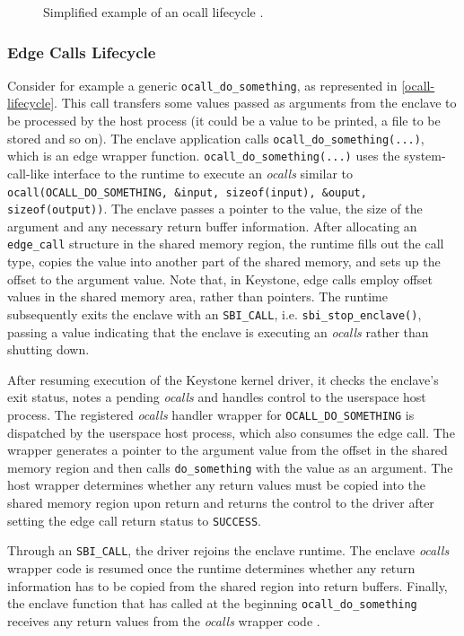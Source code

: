 \begin{figure}[h!]
    \centering
    
    \caption{Simplified example of an ocall lifecycle \cite{keystone-doc}.}
    \label{ocall-lifecycle}
\end{figure}

\subsubsection{Edge Calls Lifecycle}
Consider for example a generic \texttt{ocall\_do\_something}, as represented in \autoref{ocall-lifecycle}. This call transfers some values passed as arguments from the enclave to be processed by the host process (it could be a value to be printed, a file to be stored and so on). The enclave application calls \texttt{ocall\_do\_something(...)}, which is an edge wrapper function.
\texttt{ocall\_do\_something(...)} uses the system-call-like interface to the runtime to execute an \textit{ocalls} similar to \texttt{ocall(OCALL\_DO\_SOMETHING, \&input, sizeof(input), \&ouput,  sizeof(output))}. The enclave passes a pointer to the value, the size of the argument and any necessary return buffer information. 
After allocating an \texttt{edge\_call} structure in the shared memory region, the runtime fills out the call type, copies the value into another part of the shared memory, and sets up the offset to the argument value. Note that, in Keystone, edge calls employ offset values in the shared memory area, rather than pointers.
The runtime subsequently exits the enclave with an \texttt{SBI\_CALL}, i.e. \texttt{sbi\_stop\_enclave()}, passing a value indicating that the enclave is executing an \textit{ocalls} rather than shutting down. 

After resuming execution of the Keystone kernel driver, it checks the enclave's exit status, notes a pending \textit{ocalls} and handles control to the userspace host process. 
The registered \textit{ocalls} handler wrapper for \texttt{OCALL\_DO\_SOMETHING} is dispatched by the userspace host process, which also consumes the edge call. The wrapper generates a pointer to the argument value from the offset in the shared memory region and then calls \texttt{do\_something} with the value as an argument. The host wrapper determines whether any return values must be copied into the shared memory region upon return and returns the control to the driver after setting the edge call return status to \texttt{SUCCESS}. 

Through an \texttt{SBI\_CALL}, the driver rejoins the enclave runtime. The enclave \textit{ocalls} wrapper code is resumed once the runtime determines whether any return information has to be copied from the shared region into return buffers. Finally, the enclave function that has called at the beginning \texttt{ocall\_do\_something} receives any return values from the \textit{ocalls} wrapper code \cite{keystone-doc}.


